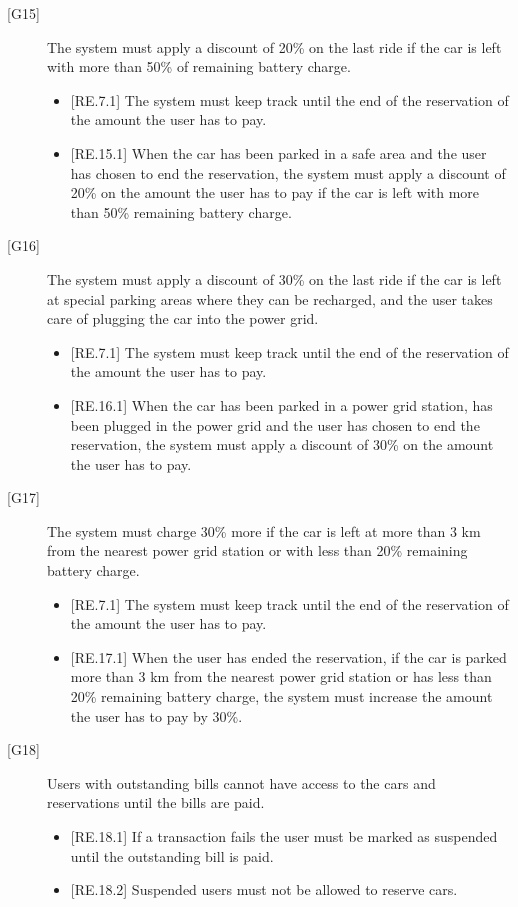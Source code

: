 \documentclass[english]{article}
\begin{document}
\begin{description}
\item[{[G15]}]{The system must apply a discount of 20\% on the last ride if the car is left with more than 50\% of remaining battery charge.
\begin{itemize}
	\item{[RE.7.1] The system must keep track until the end of the reservation of the amount the user has to pay.}
	\item{[RE.15.1] When the car has been parked in a safe area and the user has chosen to end the reservation, the system must apply a discount of 20\% on the amount the user has to pay if the car is left with more than 50\% remaining battery charge.}
\end{itemize}
}

\item[{[G16]}]{The system must apply a discount of 30\% on the last ride if the car is left at special parking areas where they can be recharged, and the user takes care of plugging the car into the power grid.
\begin{itemize}
	\item{[RE.7.1] The system must keep track until the end of the reservation of the amount the user has to pay.}
	\item{[RE.16.1] When the car has been parked in a power grid station, has been plugged in the power grid and the user has chosen to end the reservation, the system must apply a discount of 30\% on the amount the user has to pay.}
\end{itemize}
}

\item[{[G17]}]{The system must charge 30\% more if the car is left at more than 3 km from the nearest power grid station or with less than 20\% remaining battery charge.
\begin{itemize}
	\item{[RE.7.1] The system must keep track until the end of the reservation of the amount the user has to pay.}
	\item{[RE.17.1] When the user has ended the reservation, if the car is parked more than 3 km from the nearest power grid station or has less than 20\% remaining battery charge, the system must increase the amount the user has to pay by 30\%.}
\end{itemize}
}

\item[{[G18]}]{Users with outstanding bills cannot have access to the cars and reservations until the bills are paid.
\begin{itemize}
	\item{[RE.18.1] If a transaction fails the user must be marked as suspended until the outstanding bill is paid.}
	\item{[RE.18.2] Suspended users must not be allowed to reserve cars.}
\end{itemize}
}


\end{description}
\end{document}
